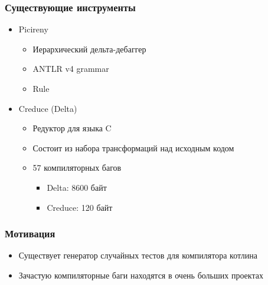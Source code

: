 
\begin{frame}
	\frametitle{Существующие инструменты}
	\begin{itemize}
		\item Picireny
			\begin{itemize}
				\item Иерархический дельта-дебаггер
				\item ANTLR v4 grammar
				\item Rule
			\end{itemize}
		\item Creduce (Delta)
			\begin{itemize}
				\item Редуктор для языка C
				\item Состоит из набора трансформаций над исходным кодом
				\item 57 компиляторных багов
				\begin{itemize}
					\item Delta: 8600 байт
					\item Creduce: 120 байт
				\end{itemize}
			\end{itemize}
	\end{itemize}
\end{frame}

\begin{frame}
	\frametitle{Мотивация}
	\begin{itemize}
		\item Существует генератор случайных тестов для компилятора котлина
		\item Зачастую компиляторные баги находятся в очень больших проектах
	\end{itemize}
\end{frame}


